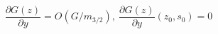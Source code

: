\begin{equation}\label{z}
 \frac{\partial G(z)}{\partial y} = O(G/m_{3/2}),\  \frac{\partial G(z)}{\partial
 y}(z_{0},s_{0})=0
\end{equation}

